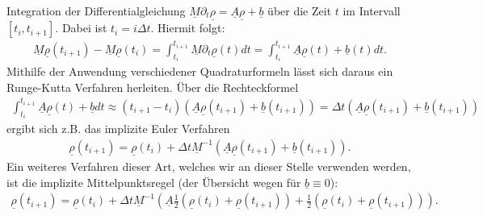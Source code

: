 Integration der Differentialgleichung $\underline{M} \partial_t \underline{\rho} = \underline{A} \underline{\rho} + \underline{b}$ über die Zeit $t$ im Intervall $[t_i, t_{i+1}]$.
Dabei ist $t_i = i \Delta t$. Hiermit folgt:
\begin{align*}
\underline{M}\underline{\rho}(t_{i+1}) - \underline{M}\underline{\rho}(t_i) = \int_{t_i}^{t_{i+1}}
\underline{M} \partial_t \underline{\rho}(t) dt =\int_{t_i}^{t_{i+1}} \underline{A} \underline{\rho}(t) + \underline{b}(t) dt.
\end{align*}
Mithilfe der Anwendung verschiedener Quadraturformeln lässt sich daraus ein Runge-Kutta Verfahren herleiten. Über die Rechteckformel 
\begin{align*}
\int_{t_i}^{t_{i+1}}\underline{A} \underline{\rho}(t) + \underline{b} dt \approx (t_{i+1}-t_i)( 
\underline{A} \underline{\rho}(t_{i+1}) + \underline{b}(t_{i+1})) = \Delta t (\underline{A} \underline{\rho}(t_{i+1}) + \underline{b}(t_{i+1}))
\end{align*}
ergibt sich z.B. das implizite Euler Verfahren
\begin{align*}
\underline{\rho}(t_{i+1}) = \underline{\rho}(t_{i}) + \Delta t \underline{M}^{-1}(\underline{A} \underline{\rho}(t_{i+1}) + \underline{b}(t_{i+1})).
\end{align*}
Ein weiteres Verfahren dieser Art, welches wir an dieser Stelle verwenden werden, ist die implizite Mittelpunktsregel (der Übersicht wegen für $\underline{b} \equiv 0$):
\begin{align*}
\underline{\rho}(t_{i+1}) = \underline{\rho}(t_{i}) +
\Delta t \underline{M}^{-1} (
\underline{A} 
\frac{1}{2}(\underline{\rho}(t_{i}) +
\underline{\rho}(t_{i+1}) )
+
\frac{1}{2} ( \underline{\rho}(t_{i}) +
\underline{\rho}(t_{i+1}) )).
\end{align*}

